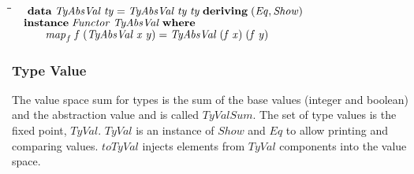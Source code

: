 \documentclass[10pt]{article}
\newlength{\lwidth}\setlength{\lwidth}{4.5cm}
\newlength{\cwidth}\setlength{\cwidth}{8mm} %
\newcommand{\Conid}[1]{\mathit{#1}}
\newcommand{\Varid}[1]{\mathit{#1}}
\begin{document}
\begin{tabbing}
\qquad\=\hspace{\lwidth}\=\hspace{\cwidth}\=\+\kill
${\hskip1.00em\relax\mathbf{data}\;\Conid{TyAbsVal}\;\Varid{ty}\mathrel{=}\Conid{TyAbsVal}\;\Varid{ty}\;\Varid{ty}\;\mathbf{deriving}\;(\Conid{Eq},\Conid{Show})}$\\
${}$\\
${\hskip1.00em\relax\mathbf{instance}\;\Conid{Functor}\;\Conid{TyAbsVal}\;\mathbf{where}}$\\
${\hskip1.00em\relax\hskip2.00em\relax\Varid{map}_{f}\;\Varid{f}\;(\Conid{TyAbsVal}\;\Varid{x}\;\Varid{y})\mathrel{=}\Conid{TyAbsVal}\;(\Varid{f}\;\Varid{x})\;(\Varid{f}\;\Varid{y})}$
\end{tabbing}
\subsubsection{Type Value}

The value space sum for types is the sum of the base values (integer
and boolean) and the abstraction value and is called \ensuremath{\Conid{TyValSum}}.  The
set of type values is the fixed point, \ensuremath{\Conid{TyVal}}.  \ensuremath{\Conid{TyVal}} is an
instance of \ensuremath{\Conid{Show}} and \ensuremath{\Conid{Eq}} to allow printing and comparing values.
\ensuremath{\Varid{toTyVal}} injects elements from \ensuremath{\Conid{TyVal}} components into the value
space.
\end{document}
